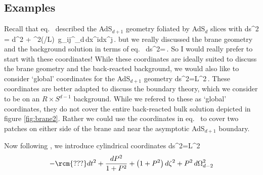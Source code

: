 \subsection{Examples}\label{sec:examples}


Recall that eq.~ described the AdS$_{d+1}$ geometry foliated by AdS$_d$ slices with
\beq\label{metric1a}
ds^2 %
= d\rho^2 + \cosh^2\left({\rho}/{L}\right)\, g_{ij}^{_d}\,dx^{i}dx^{j}\,.
\eeq
but we really discussed the brane geometry and the background solution in terms of eq.~
\beq\label{metric3a}
ds^2=\,.
\eeq 
So I would really prefer to start with these coordinates! While these coordinates are ideally suited to discuss the brane geometry and the back-reacted background, we would also like to consider `global' coordinates for the AdS$_{d+1}$ geometry
\beq\label{metric2s}
ds^2=L^2\,.
\eeq 
These coordinates are better adapted to discuss the boundary theory, which we consider to be on an $R\times S^{d-1}$ background. While we refered to these as `global' coordinates, they do not cover the entire back-reacted bulk solution depicted in figure \ref{fig:brane2}. Rather we could use the coordinates in eq.~ to cover two patches on either side of the brane and near the asymptotic AdS$_{d+1}$ boundary.


Now following \cite{Krtous:2014pva}, we introduce cylindrical coordinates
\beq\label{cylindd}
ds^2=L^2\[ -\rcm{???}dt^2+\frac{dP^2}{1+P^2}+\left( 1+P^2 \right)d\zeta^2+P^2\,d\Omega_{d-2}^2\]
\eeq
{}

